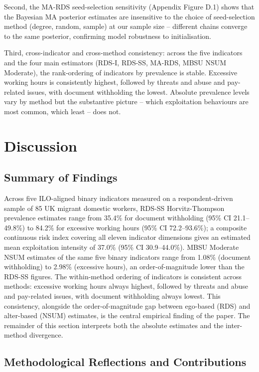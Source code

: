 \documentclass[
  12pt,
  letterpaper,
  DIV=11,
  numbers=noendperiod]{scrartcl}
\begin{document}
Second, the MA-RDS seed-selection sensitivity (Appendix Figure D.1)
shows that the Bayesian MA posterior estimates are insensitive to the
choice of seed-selection method (degree, random, sample) at our sample
size -- different chains converge to the same posterior, confirming
model robustness to initialisation.

Third, cross-indicator and cross-method consistency: across the five
indicators and the four main estimators (RDS-I, RDS-SS, MA-RDS, MBSU
NSUM Moderate), the rank-ordering of indicators by prevalence is stable.
Excessive working hours is consistently highest, followed by threats and
abuse and pay-related issues, with document withholding the lowest.
Absolute prevalence levels vary by method but the substantive picture --
which exploitation behaviours are most common, which least -- does not.

\section{Discussion}\label{sec-discussion}

\subsection{Summary of Findings}\label{sec-summary}

Across five ILO-aligned binary indicators measured on a
respondent-driven sample of 85 UK migrant domestic workers, RDS-SS
Horvitz-Thompson prevalence estimates range from 35.4\% for document
withholding (95\% CI 21.1--49.8\%) to 84.2\% for excessive working hours
(95\% CI 72.2--93.6\%); a composite continuous risk index covering all
eleven indicator dimensions gives an estimated mean exploitation
intensity of 37.0\% (95\% CI 30.9--44.0\%). MBSU Moderate NSUM estimates
of the same five binary indicators range from 1.08\% (document
withholding) to 2.98\% (excessive hours), an order-of-magnitude lower
than the RDS-SS figures. The within-method ordering of indicators is
consistent across methods: excessive working hours always highest,
followed by threats and abuse and pay-related issues, with document
withholding always lowest. This consistency, alongside the
order-of-magnitude gap between ego-based (RDS) and alter-based (NSUM)
estimates, is the central empirical finding of the paper. The remainder
of this section interprets both the absolute estimates and the
inter-method divergence.

\subsection{Methodological Reflections and
Contributions}\label{sec-contributions}
\end{document}
